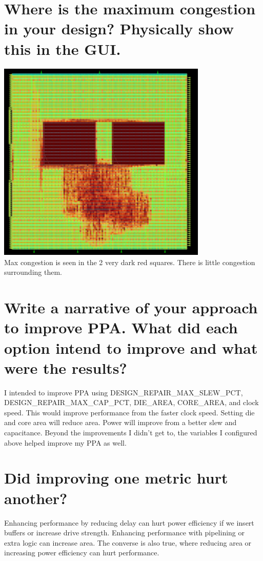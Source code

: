 \documentclass{article}
\begin{document}
\begin{flushleft}
\section{Where is the maximum congestion in your design? Physically show this in the GUI.}
\includegraphics[width=10cm]{congestion.png} \\
Max congestion is seen in the 2 very dark red squares. There is little congestion surrounding them.
\section{Write a narrative of your approach to improve PPA. What did each option intend to improve and what were the results?}
I intended to improve PPA using DESIGN\_REPAIR\_MAX\_SLEW\_PCT, DESIGN\_REPAIR\_MAX\_CAP\_PCT, DIE\_AREA, CORE\_AREA, and clock speed. This would improve performance from the faster clock speed. Setting die and core area will reduce area. Power will improve from a better slew and capacitance. Beyond the improvements I didn't get to, the variables I configured above helped improve my PPA as well.

\section{Did improving one metric hurt another?}
Enhancing performance by reducing delay can hurt power efficiency if we insert buffers or increase drive strength. Enhancing performance with pipelining or extra logic can increase area. The converse is also true, where reducing area or increasing power efficiency can hurt performance.

\end{flushleft}
\end{document}
